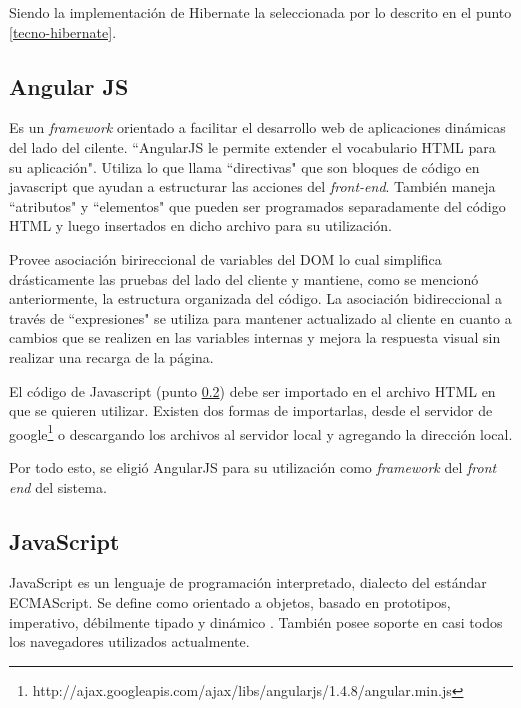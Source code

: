         Siendo la implementación de Hibernate la seleccionada por lo descrito en el punto \ref{tecno-hibernate}.
        
        \subsection{Angular JS}
        \label{tecno-angular}
        
        Es un \textit{framework} orientado a facilitar el desarrollo web de aplicaciones dinámicas del lado del cilente. ``AngularJS le permite extender el vocabulario HTML para su aplicación"\cite{ANGULARJS-angularjs}. Utiliza lo que llama ``directivas" que son bloques de código en javascript que ayudan a estructurar las acciones del \textit{front-end}. También maneja ``atributos" y ``elementos" que pueden ser programados separadamente del código HTML y luego insertados en dicho archivo para su utilización.
        
        Provee asociación birireccional de variables del DOM lo cual simplifica drásticamente las pruebas del lado del cliente y mantiene, como se mencionó anteriormente, la estructura organizada del código. La asociación bidireccional a través de ``expresiones" se utiliza para mantener actualizado al cliente en cuanto a cambios que se realizen en las variables internas y mejora la respuesta visual sin realizar una recarga de la página.
        
        El código de Javascript (punto \ref{tecno-javascript}) debe ser importado en el archivo HTML en que se quieren utilizar. Existen dos formas de importarlas, desde el servidor de google\footnote{http://ajax.googleapis.com/ajax/libs/angularjs/1.4.8/angular.min.js} o descargando los archivos al servidor local y agregando la dirección local.
        
        Por todo esto, se eligió AngularJS para su utilización como \textit{framework} del \textit{front end} del sistema.
        
        \subsection{JavaScript}
        \label{tecno-javascript}
        
        JavaScript es un lenguaje de programación interpretado, dialecto del estándar ECMAScript. Se define como orientado a objetos, basado en prototipos, imperativo, débilmente tipado y dinámico \cites{JAVASCRIPT-wiki}{JAVASCRIPT-manual}. También posee soporte en casi todos los navegadores utilizados actualmente.
        
